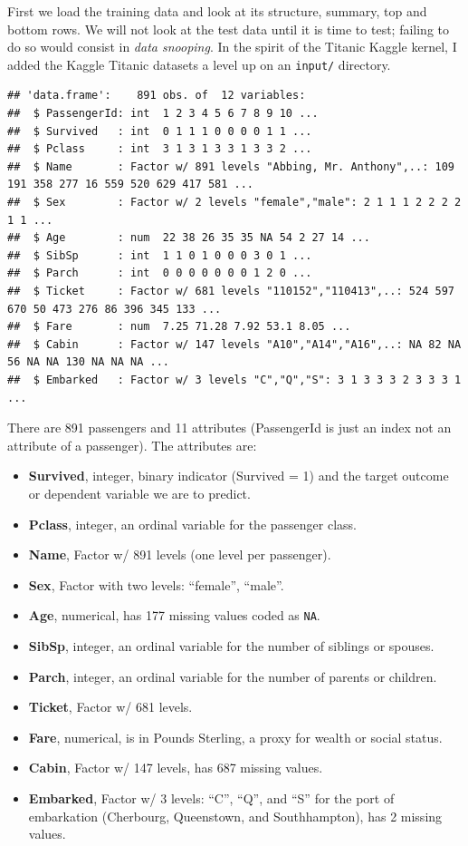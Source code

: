 \documentclass[]{article}
\providecommand{\tightlist}{%
  \setlength{\itemsep}{0pt}\setlength{\parskip}{0pt}}
\begin{document}
First we load the training data and look at its structure, summary, top
and bottom rows. We will not look at the test data until it is time to
test; failing to do so would consist in \emph{data snooping}. In the
spirit of the Titanic Kaggle kernel, I added the Kaggle Titanic datasets
a level up on an \texttt{input/} directory.

\begin{verbatim}
## 'data.frame':    891 obs. of  12 variables:
##  $ PassengerId: int  1 2 3 4 5 6 7 8 9 10 ...
##  $ Survived   : int  0 1 1 1 0 0 0 0 1 1 ...
##  $ Pclass     : int  3 1 3 1 3 3 1 3 3 2 ...
##  $ Name       : Factor w/ 891 levels "Abbing, Mr. Anthony",..: 109 191 358 277 16 559 520 629 417 581 ...
##  $ Sex        : Factor w/ 2 levels "female","male": 2 1 1 1 2 2 2 2 1 1 ...
##  $ Age        : num  22 38 26 35 35 NA 54 2 27 14 ...
##  $ SibSp      : int  1 1 0 1 0 0 0 3 0 1 ...
##  $ Parch      : int  0 0 0 0 0 0 0 1 2 0 ...
##  $ Ticket     : Factor w/ 681 levels "110152","110413",..: 524 597 670 50 473 276 86 396 345 133 ...
##  $ Fare       : num  7.25 71.28 7.92 53.1 8.05 ...
##  $ Cabin      : Factor w/ 147 levels "A10","A14","A16",..: NA 82 NA 56 NA NA 130 NA NA NA ...
##  $ Embarked   : Factor w/ 3 levels "C","Q","S": 3 1 3 3 3 2 3 3 3 1 ...
\end{verbatim}

There are 891 passengers and 11 attributes (PassengerId is just an index
not an attribute of a passenger). The attributes are:

\begin{itemize}
\tightlist
\item
  \textbf{Survived}, integer, binary indicator (Survived = 1) and the
  target outcome or dependent variable we are to predict.
\item
  \textbf{Pclass}, integer, an ordinal variable for the passenger class.
\item
  \textbf{Name}, Factor w/ 891 levels (one level per passenger).
\item
  \textbf{Sex}, Factor with two levels: ``female'', ``male''.
\item
  \textbf{Age}, numerical, has 177 missing values coded as \texttt{NA}.
\item
  \textbf{SibSp}, integer, an ordinal variable for the number of
  siblings or spouses.
\item
  \textbf{Parch}, integer, an ordinal variable for the number of parents
  or children.
\item
  \textbf{Ticket}, Factor w/ 681 levels.
\item
  \textbf{Fare}, numerical, is in Pounds Sterling, a proxy for wealth or
  social status.
\item
  \textbf{Cabin}, Factor w/ 147 levels, has 687 missing values.
\item
  \textbf{Embarked}, Factor w/ 3 levels: ``C'', ``Q'', and ``S'' for the
  port of embarkation (Cherbourg, Queenstown, and Southhampton), has 2
  missing values.
\end{itemize}
\end{document}
